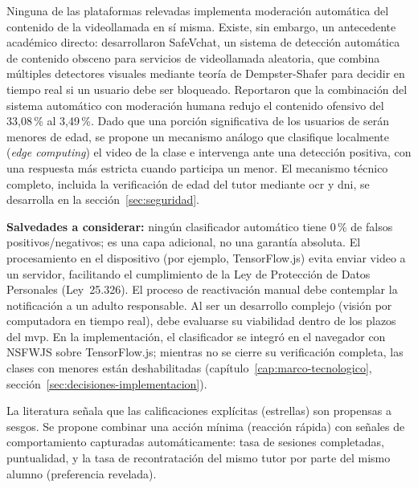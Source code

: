 \begin{description}[style=unboxed]
    \item[Sistema de detección de contenido inapropiado en tiempo real
    (``kill-switch'' de seguridad).] Ninguna de las plataformas relevadas
    implementa moderación automática del contenido de la videollamada en
    sí misma. Existe, sin embargo, un antecedente académico directo:
    \citet{liang2013} desarrollaron SafeVchat, un sistema de detección
    automática de contenido obsceno para servicios de videollamada
    aleatoria, que combina múltiples detectores visuales mediante teoría
    de Dempster-Shafer para decidir en tiempo real si un usuario debe ser
    bloqueado. Reportaron que la combinación del sistema automático con
    moderación humana redujo el contenido ofensivo del 33,08\,\% al
    3,49\,\%. Dado que una porción significativa de los usuarios de
    \sistema{} serán menores de edad, se propone un mecanismo análogo que
    clasifique localmente (\emph{edge computing}) el video de la clase e
    intervenga ante una detección positiva, con una respuesta más estricta
    cuando participa un menor.
    El mecanismo técnico completo, incluida la verificación de edad del
    tutor mediante \gls{ocr} y \gls{dni}, se desarrolla en la
    sección~\ref{sec:seguridad}.

    \textbf{Salvedades a considerar:} ningún clasificador automático
    tiene 0\,\% de falsos positivos/negativos; es una capa adicional, no
    una garantía absoluta. El procesamiento en el dispositivo (por
    ejemplo, TensorFlow.js) evita enviar video a un servidor, facilitando
    el cumplimiento de la Ley de Protección de Datos Personales
    (Ley~25.326). El proceso de reactivación manual debe contemplar la
    notificación a un adulto responsable. Al ser un desarrollo complejo
    (visión por computadora en tiempo real), debe evaluarse su viabilidad
    dentro de los plazos del \gls{mvp}. En la implementación, el
    clasificador se integró en el navegador con NSFWJS sobre TensorFlow.js;
    mientras no se cierre su verificación completa, las clases con
    menores están deshabilitadas (capítulo~\ref{cap:marco-tecnologico},
    sección~\ref{sec:decisiones-implementacion}).

    \item[Reputación con fricción reducida (señales implícitas).] La
    literatura \citep{reputation} señala que las calificaciones
    explícitas (estrellas) son propensas a sesgos. Se propone combinar
    una acción mínima (reacción rápida) con señales de comportamiento
    capturadas automáticamente: tasa de sesiones completadas,
    puntualidad, y la tasa de recontratación del mismo tutor por parte
    del mismo alumno (preferencia revelada).


\end{description}
